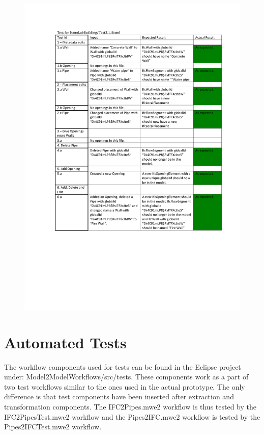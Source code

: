 \begin{figure}
    \centering
        \centerline{\includegraphics[width=150mm]{images/Test4.pdf}}
    \caption{}
    \label{fig:test4}
\end{figure}


\section{Automated Tests}
\label{app:automatedtests}
The workflow components used for tests can be found in the Eclipse project under: Model2ModelWorkflows/src/tests. These components work as a part of two test workflows similar to the ones used in the actual prototype. The only difference is that test components have been inserted after extraction and transformation components. The IFC2Pipes.mwe2 workflow is thus tested by the IFC2PipesTest.mwe2 workflow and the Pipes2IFC.mwe2 workflow is tested by the Pipes2IFCTest.mwe2 workflow.

